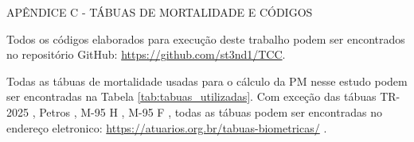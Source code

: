 \newpage
{} 
{}
\begin{center}
    APÊNDICE C - TÁBUAS DE MORTALIDADE E CÓDIGOS
\end{center}
\renewcommand{\thechapter}{Apêndice C}
\label{apendice_C}
\setcounter{equation}{0}
\renewcommand{\theequation}{C.\arabic{equation}}

Todos os códigos elaborados para execução deste trabalho podem ser encontrados no repositório GitHub: \url{https://github.com/st3nd1/TCC}.

Todas as tábuas de mortalidade usadas para o cálculo da PM nesse estudo podem ser encontradas na Tabela \ref{tab:tabuas_utilizadas}. Com exceção das tábuas TR-2025 \cite{ssa_actuarial_life_table}, Petros \cite{soa_petros_2822}, M-95 H \cite{soa_m95h_23001}, M-95 F \cite{soa_m95m_23002}, todas as tábuas podem ser encontradas no endereço eletronico: \url{https://atuarios.org.br/tabuas-biometricas/} \cite{iba_tabuas_biometricas}.

